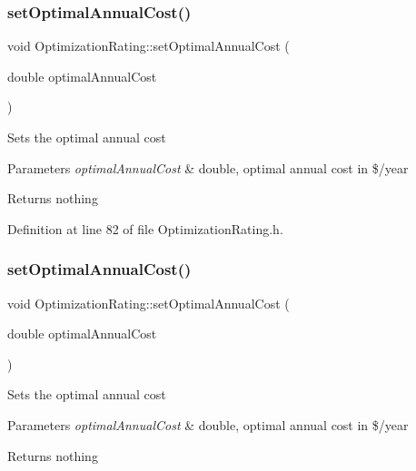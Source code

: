 \subsubsection{\texorpdfstring{set\+Optimal\+Annual\+Cost()}{setOptimalAnnualCost()}\hspace{0.1cm}{\footnotesize\ttfamily [1/3]}}
{\footnotesize\ttfamily void Optimization\+Rating\+::set\+Optimal\+Annual\+Cost (\begin{DoxyParamCaption}\item[{double}]{optimal\+Annual\+Cost }\end{DoxyParamCaption})\hspace{0.3cm}{\ttfamily [inline]}}

Sets the optimal annual cost


\begin{DoxyParams}{Parameters}
{\em optimal\+Annual\+Cost} & double, optimal annual cost in \$/year\\
\hline
\end{DoxyParams}
\begin{DoxyReturn}{Returns}
nothing 
\end{DoxyReturn}


Definition at line 82 of file Optimization\+Rating.\+h.

\mbox{\label{class_optimization_rating_a4651985a899b2bff18e8356a42c2d37f}} 
\subsubsection{\texorpdfstring{set\+Optimal\+Annual\+Cost()}{setOptimalAnnualCost()}\hspace{0.1cm}{\footnotesize\ttfamily [2/3]}}
{\footnotesize\ttfamily void Optimization\+Rating\+::set\+Optimal\+Annual\+Cost (\begin{DoxyParamCaption}\item[{double}]{optimal\+Annual\+Cost }\end{DoxyParamCaption})\hspace{0.3cm}{\ttfamily [inline]}}

Sets the optimal annual cost


\begin{DoxyParams}{Parameters}
{\em optimal\+Annual\+Cost} & double, optimal annual cost in \$/year\\
\hline
\end{DoxyParams}
\begin{DoxyReturn}{Returns}
nothing 
\end{DoxyReturn}


